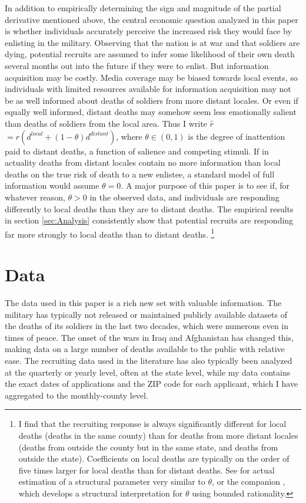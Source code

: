 \documentclass[12pt] {article}
\begin{document}
In addition to empirically determining the sign and magnitude of the
partial derivative mentioned above, the central economic question
analyzed in this paper is whether individuals accurately perceive
the increased risk they would face by enlisting in the military. Observing
that the nation is at war and that soldiers are dying, potential recruits
are assumed to infer some likelihood of their own death several months
out into the future if they were to enlist. But information acquisition
may be costly. Media coverage may be biased towards local events,
so individuals with limited resources available for information acquisition
may not be as well informed about deaths of soldiers from more distant
locales. Or even if equally well informed, distant deaths may somehow
seem less emotionally salient than deaths of soldiers from the local
area. Thus I write $\hat{r}$$=r(d^{local}+(1-\theta)d^{distant})$,
where $\theta\in(0,1)$ is the degree of inattention paid to distant
deaths, a function of salience and competing stimuli. If in actuality
deaths from distant locales contain no more information than local deaths
on the true risk of death to a new enlistee, a standard model of full information would assume
$\theta=0$. A major purpose of this paper is to see if, for whatever
reason, $\theta>0$ in the observed data, and individuals are responding
differently to local deaths than they are to distant deaths. The empirical
results in section \ref{sec:Analysis} consistently show that potential
recruits are responding far more strongly to local deaths than to
distant deaths. %
\footnote{I find that the recruiting response is always significantly different
for local deaths (deaths in the same county) than for deaths from
more distant locales (deaths from outside the county but in the same
state, and deaths from outside the state). Coefficients on local deaths
are typically on the order of five times larger for local deaths than
for distant deaths. See \cite{ChettySalience} for actual estimation
of a structural parameter very similar to $\theta$, or the companion \cite{ChettyEarly},
which develops a structural interpretation for $\theta$ using bounded
rationality.%
}


\section{Data\label{sec:Data}}


The data used in this paper is a rich new set with valuable information.
The military has typically not released or maintained publicly available
datasets of the deaths of its soldiers in the last two decades, which
were numerous even in times of peace. The onset of the wars in Iraq
and Afghanistan has changed this, making data on a large number of
deaths available to the public with relative ease. The recruiting
data used in the literature has also typically been analyzed at the
quarterly or yearly level, often at the state level, while my data
contains the exact dates of applications and the ZIP code for each
applicant, which I have aggregated to the monthly-county level. 
\end{document}
